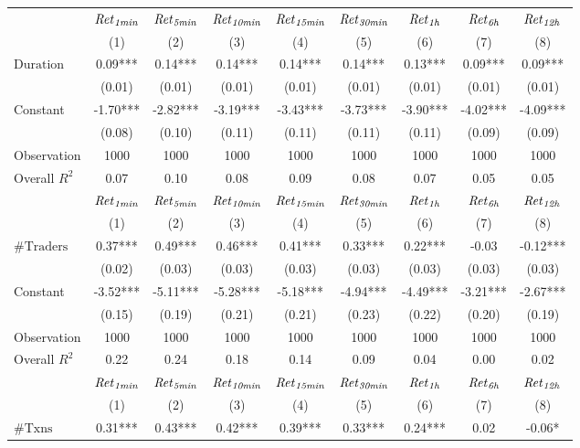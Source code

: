 \begin{tabular}{lcccccccc}
\hline
 & ${\it Ret}_{\it 1min}$ & ${\it Ret}_{\it 5min}$ & ${\it Ret}_{\it 10min}$ & ${\it Ret}_{\it 15min}$ & ${\it Ret}_{\it 30min}$ & ${\it Ret}_{\it 1h}$ & ${\it Ret}_{\it 6h}$ & ${\it Ret}_{\it 12h}$ \\
 & (1) & (2) & (3) & (4) & (5) & (6) & (7) & (8) \\
\hline
$\text{Duration}$ & 0.09*** & 0.14*** & 0.14*** & 0.14*** & 0.14*** & 0.13*** & 0.09*** & 0.09*** \\
 & (0.01) & (0.01) & (0.01) & (0.01) & (0.01) & (0.01) & (0.01) & (0.01) \\
Constant & -1.70*** & -2.82*** & -3.19*** & -3.43*** & -3.73*** & -3.90*** & -4.02*** & -4.09*** \\
 & (0.08) & (0.10) & (0.11) & (0.11) & (0.11) & (0.11) & (0.09) & (0.09) \\
Observation & 1000 & 1000 & 1000 & 1000 & 1000 & 1000 & 1000 & 1000 \\
Overall $R^2$ & 0.07 & 0.10 & 0.08 & 0.09 & 0.08 & 0.07 & 0.05 & 0.05 \\
\hline
 & ${\it Ret}_{\it 1min}$ & ${\it Ret}_{\it 5min}$ & ${\it Ret}_{\it 10min}$ & ${\it Ret}_{\it 15min}$ & ${\it Ret}_{\it 30min}$ & ${\it Ret}_{\it 1h}$ & ${\it Ret}_{\it 6h}$ & ${\it Ret}_{\it 12h}$ \\
 & (1) & (2) & (3) & (4) & (5) & (6) & (7) & (8) \\
\hline
$\#\text{Traders}$ & 0.37*** & 0.49*** & 0.46*** & 0.41*** & 0.33*** & 0.22*** & -0.03 & -0.12*** \\
 & (0.02) & (0.03) & (0.03) & (0.03) & (0.03) & (0.03) & (0.03) & (0.03) \\
Constant & -3.52*** & -5.11*** & -5.28*** & -5.18*** & -4.94*** & -4.49*** & -3.21*** & -2.67*** \\
 & (0.15) & (0.19) & (0.21) & (0.21) & (0.23) & (0.22) & (0.20) & (0.19) \\
Observation & 1000 & 1000 & 1000 & 1000 & 1000 & 1000 & 1000 & 1000 \\
Overall $R^2$ & 0.22 & 0.24 & 0.18 & 0.14 & 0.09 & 0.04 & 0.00 & 0.02 \\
\hline
 & ${\it Ret}_{\it 1min}$ & ${\it Ret}_{\it 5min}$ & ${\it Ret}_{\it 10min}$ & ${\it Ret}_{\it 15min}$ & ${\it Ret}_{\it 30min}$ & ${\it Ret}_{\it 1h}$ & ${\it Ret}_{\it 6h}$ & ${\it Ret}_{\it 12h}$ \\
 & (1) & (2) & (3) & (4) & (5) & (6) & (7) & (8) \\
\hline
$\#\text{Txns}$ & 0.31*** & 0.43*** & 0.42*** & 0.39*** & 0.33*** & 0.24*** & 0.02 & -0.06* \\

\end{tabular}
